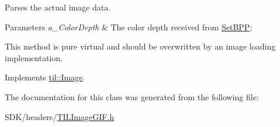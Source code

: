 Parses the actual image data. 


\begin{DoxyParams}{Parameters}
{\em a\_\-ColorDepth} & The color depth received from \hyperlink{classtil_1_1_image_ae1202f84c0addb81eba161f746a9d4cc}{SetBPP};\\
\hline
\end{DoxyParams}
This method is pure virtual and should be overwritten by an image loading implementation. 

Implements \hyperlink{classtil_1_1_image_a2436c982f6b403ab07591f06107fe432}{til::Image}.



The documentation for this class was generated from the following file:\begin{DoxyCompactItemize}
\item 
SDK/headers/\hyperlink{_t_i_l_image_g_i_f_8h}{TILImageGIF.h}\end{DoxyCompactItemize}
